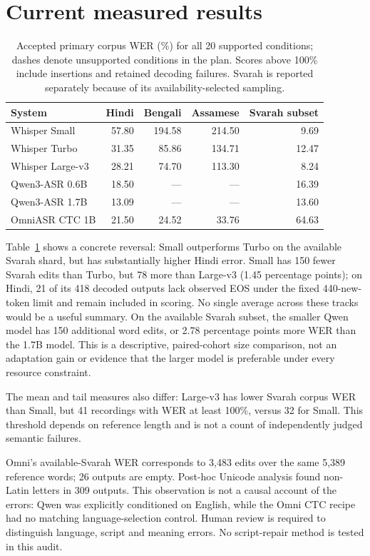 \documentclass[11pt]{article}
\begin{document}
\section{Current measured results}
\begin{table}[h]
\centering
\begin{tabular}{lrrrr}\toprule
System & Hindi & Bengali & Assamese & Svarah subset \\\midrule
Whisper Small & 57.80 & 194.58 & 214.50 & 9.69 \\
Whisper Turbo & 31.35 & 85.86 & 134.71 & 12.47 \\
Whisper Large-v3 & 28.21 & 74.70 & 113.30 & 8.24 \\
Qwen3-ASR 0.6B & 18.50 & --- & --- & 16.39 \\
Qwen3-ASR 1.7B & 13.09 & --- & --- & 13.60 \\
OmniASR CTC 1B & 21.50 & 24.52 & 33.76 & 64.63 \\\bottomrule
\end{tabular}
\caption{Accepted primary corpus WER (\%) for all 20 supported conditions; dashes denote unsupported conditions in the plan. Scores above 100\% include insertions and retained decoding failures. Svarah is reported separately because of its availability-selected sampling.}\label{tab:wer}
\end{table}
Table~\ref{tab:wer} shows a concrete reversal: Small outperforms Turbo on the available Svarah shard, but has substantially higher Hindi error. Small has 150 fewer Svarah edits than Turbo, but 78 more than Large-v3 (1.45 percentage points); on Hindi, 21 of its 418 decoded outputs lack observed EOS under the fixed 440-new-token limit and remain included in scoring. No single average across these tracks would be a useful summary. On the available Svarah subset, the smaller Qwen model has 150 additional word edits, or 2.78 percentage points more WER than the 1.7B model. This is a descriptive, paired-cohort size comparison, not an adaptation gain or evidence that the larger model is preferable under every resource constraint.

The mean and tail measures also differ: Large-v3 has lower Svarah corpus WER than Small, but 41 recordings with WER at least 100\%, versus 32 for Small. This threshold depends on reference length and is not a count of independently judged semantic failures.

Omni's available-Svarah WER corresponds to 3,483 edits over the same 5,389 reference words; 26 outputs are empty. Post-hoc Unicode analysis found non-Latin letters in 309 outputs. This observation is not a causal account of the errors: Qwen was explicitly conditioned on English, while the Omni CTC recipe had no matching language-selection control. Human review is required to distinguish language, script and meaning errors. No script-repair method is tested in this audit.
\end{document}
